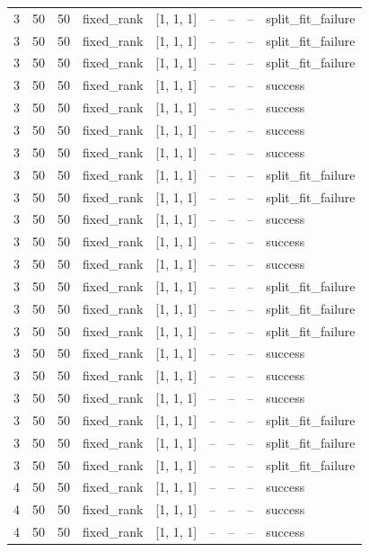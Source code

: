 \begin{longtable}{lllllllll}
3 & 50 & 50 & fixed\_rank & [1, 1, 1] & -- & -- & -- & split\_fit\_failure \\
3 & 50 & 50 & fixed\_rank & [1, 1, 1] & -- & -- & -- & split\_fit\_failure \\
3 & 50 & 50 & fixed\_rank & [1, 1, 1] & -- & -- & -- & split\_fit\_failure \\
3 & 50 & 50 & fixed\_rank & [1, 1, 1] & -- & -- & -- & success \\
3 & 50 & 50 & fixed\_rank & [1, 1, 1] & -- & -- & -- & success \\
3 & 50 & 50 & fixed\_rank & [1, 1, 1] & -- & -- & -- & success \\
3 & 50 & 50 & fixed\_rank & [1, 1, 1] & -- & -- & -- & success \\
3 & 50 & 50 & fixed\_rank & [1, 1, 1] & -- & -- & -- & split\_fit\_failure \\
3 & 50 & 50 & fixed\_rank & [1, 1, 1] & -- & -- & -- & split\_fit\_failure \\
3 & 50 & 50 & fixed\_rank & [1, 1, 1] & -- & -- & -- & success \\
3 & 50 & 50 & fixed\_rank & [1, 1, 1] & -- & -- & -- & success \\
3 & 50 & 50 & fixed\_rank & [1, 1, 1] & -- & -- & -- & success \\
3 & 50 & 50 & fixed\_rank & [1, 1, 1] & -- & -- & -- & split\_fit\_failure \\
3 & 50 & 50 & fixed\_rank & [1, 1, 1] & -- & -- & -- & split\_fit\_failure \\
3 & 50 & 50 & fixed\_rank & [1, 1, 1] & -- & -- & -- & split\_fit\_failure \\
3 & 50 & 50 & fixed\_rank & [1, 1, 1] & -- & -- & -- & success \\
3 & 50 & 50 & fixed\_rank & [1, 1, 1] & -- & -- & -- & success \\
3 & 50 & 50 & fixed\_rank & [1, 1, 1] & -- & -- & -- & success \\
3 & 50 & 50 & fixed\_rank & [1, 1, 1] & -- & -- & -- & split\_fit\_failure \\
3 & 50 & 50 & fixed\_rank & [1, 1, 1] & -- & -- & -- & split\_fit\_failure \\
3 & 50 & 50 & fixed\_rank & [1, 1, 1] & -- & -- & -- & split\_fit\_failure \\
4 & 50 & 50 & fixed\_rank & [1, 1, 1] & -- & -- & -- & success \\
4 & 50 & 50 & fixed\_rank & [1, 1, 1] & -- & -- & -- & success \\
4 & 50 & 50 & fixed\_rank & [1, 1, 1] & -- & -- & -- & success \\

\end{longtable}
